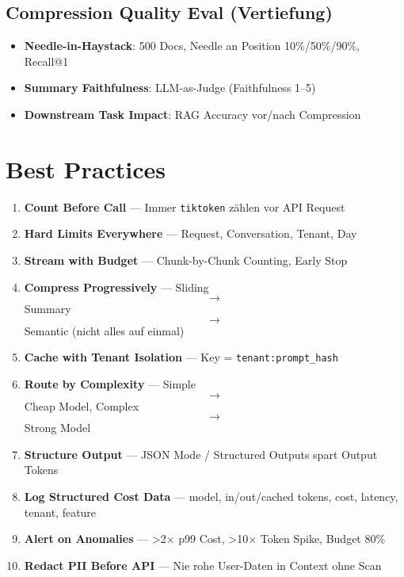 \subsection{Compression Quality Eval (Vertiefung)}
\label{sec:compression_eval}

\begin{itemize}[leftmargin=*]
  \item \textbf{Needle-in-Haystack}: 500 Docs, Needle an Position 10\%/50\%/90\%, Recall@1
  \item \textbf{Summary Faithfulness}: LLM-as-Judge (Faithfulness 1--5)
  \item \textbf{Downstream Task Impact}: RAG Accuracy vor/nach Compression
\end{itemize}


\section{Best Practices}
\label{sec:best_practices}

\begin{enumerate}[leftmargin=*]
  \item \textbf{Count Before Call} --- Immer \texttt{tiktoken} zählen vor API Request
  \item \textbf{Hard Limits Everywhere} --- Request, Conversation, Tenant, Day
  \item \textbf{Stream with Budget} --- Chunk-by-Chunk Counting, Early Stop
  \item \textbf{Compress Progressively} --- Sliding $$\to$$ Summary $$\to$$ Semantic (nicht alles auf einmal)
  \item \textbf{Cache with Tenant Isolation} --- Key = \texttt{tenant:prompt\_hash}
  \item \textbf{Route by Complexity} --- Simple $$\to$$ Cheap Model, Complex $$\to$$ Strong Model
  \item \textbf{Structure Output} --- JSON Mode / Structured Outputs spart Output Tokens
  \item \textbf{Log Structured Cost Data} --- model, in/out/cached tokens, cost, latency, tenant, feature
  \item \textbf{Alert on Anomalies} --- >2$\times$ p99 Cost, >10$\times$ Token Spike, Budget 80\%
  \item \textbf{Redact PII Before API} --- Nie rohe User-Daten in Context ohne Scan
\end{enumerate}

